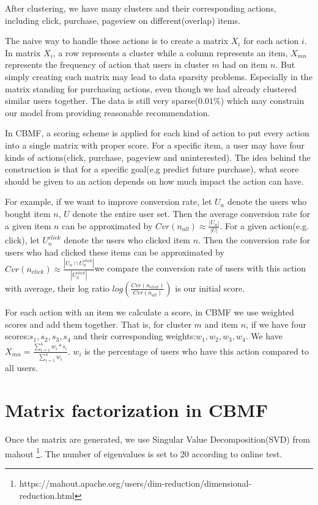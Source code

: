 After clustering, we have many clusters and their corresponding actions, including click, purchase, pageview on different(overlap) items.

The naive way to handle those actions is to create a matrix $X_i$ for each action $i$. In matrix $X_i$, a row represents a cluster while a column represents an item, $X_{mn}$ represents the frequency of action that users in cluster $m$ had on item $n$. But simply creating such matrix may lead to data sparsity problems. Especially in the matrix standing for purchasing actions, even though we had already clustered similar users together. The data is still very sparse($0.01\%$) which may constrain our model from providing reasonable recommendation.

In CBMF, a scoring scheme is applied for each kind of action to put every action into a single matrix with proper score. For a specific item, a user may have four kinds of actions(click, purchase, pageview and uninterested). The idea behind the construction is that for a specific goal(e.g predict future purchase), what score should be given to an action depends on how much impact the action can have. 

For example, if we want to improve conversion rate, let $U_n$ denote the users who bought item $n$, $U$ denote the entire user set. Then the average conversion rate for a given item $n$ can be approximated by $Cvr(n_{all}) \approx \frac{|U_n|}{|U|}$. 
For a given action(e.g. click), let $U_n^{click}$ denote the users who clicked item $n$. Then the conversion rate for users who had clicked these items can be approximated by $Cvr(n_{click}) \approx \frac{|U_n \cap U_n^{click}|}{|U_n^{click}|}$we compare the conversion rate of users with this action with average, their log ratio $log(\frac{Cvr(n_{click})}{Cvr(n_{all})})$ is our initial score.

For each action with an item we calculate a score, in CBMF we use weighted scores and add them together. That is, for cluster $m$ and item $n$, if we have four scores:$s_1, s_2, s_3, s_4$ and their corresponding weights:$w_1, w_2, w_3, w_4$. We have $X_{mn} = \frac{\sum_{i=1}^4 w_i*s_i}{\sum_{i=1}^4 w_i}$. $w_i$ is the percentage of users who have this action compared to all users.

\section{Matrix factorization in CBMF}

Once the matrix are generated, we use Singular Value Decomposition(SVD) from mahout \footnote{https://mahout.apache.org/users/dim-reduction/dimensional-reduction.html}. The number of eigenvalues is set to 20 according to online test.

